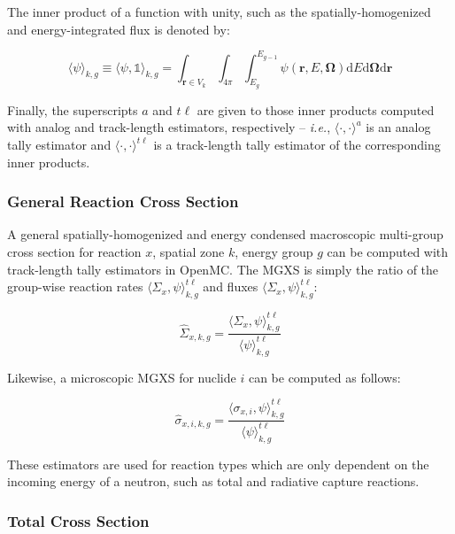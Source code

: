 \noindent The inner product of a function with unity, such as the spatially-homogenized and energy-integrated flux is denoted by:

\begin{equation}
\label{eqn:chap3-angle-flux}
\langle \psi \rangle_{k,g} \equiv \langle \psi, \mathbb{1} \rangle_{k,g} = \int_{\mathbf{r} \in V_{k}} \int_{4\pi} \int_{E_{g}}^{E_{g-1}} \psi(\mathbf{r},E,\mathbf{\Omega}) \mathrm{d}E\mathrm{d}\mathbf{\Omega}\mathrm{d}\mathbf{r}
\end{equation}

Finally, the superscripts $a$ and $t\ell$ are given to those inner products computed with analog and track-length estimators, respectively -- \textit{i.e.}, $\langle \cdot,\cdot \rangle^{a}$ is an analog tally estimator and $\langle \cdot,\cdot \rangle^{t\ell}$ is a track-length tally estimator of the corresponding inner products.


\subsubsection{General Reaction Cross Section}
\label{subsubsec:chap3-gen-xs}

A general spatially-homogenized and energy condensed macroscopic multi-group cross section for reaction $x$, spatial zone $k$, energy group $g$ can be computed with track-length tally estimators in OpenMC. The \ac{MGXS} is simply the ratio of the group-wise reaction rates $\langle \Sigma_{x}, \psi \rangle_{k,g}^{t\ell}$ and fluxes $\langle \Sigma_{x}, \psi \rangle_{k,g}^{t\ell}$:

\begin{equation}
\label{eqn:chap3-general-macro}
\hat{\Sigma}_{x,k,g} = \frac{\langle \Sigma_{x}, \psi \rangle_{k,g}^{t\ell}}{\langle \psi \rangle_{k,g}^{t\ell}}
\end{equation}

\noindent Likewise, a microscopic \ac{MGXS} for nuclide $i$ can be computed as follows:

\begin{equation}
\label{eqn:chap3-general-micro}
\hat{\sigma}_{x,i,k,g} = \frac{\langle \sigma_{x,i}, \psi \rangle_{k,g}^{t\ell}}{\langle \psi \rangle_{k,g}^{t\ell}}
\end{equation}

These estimators are used for reaction types which are only dependent on the incoming energy of a neutron, such as total and radiative capture reactions.


\subsubsection{Total Cross Section}
\label{subsubsec:chap3-tally-types-tot-xs}

